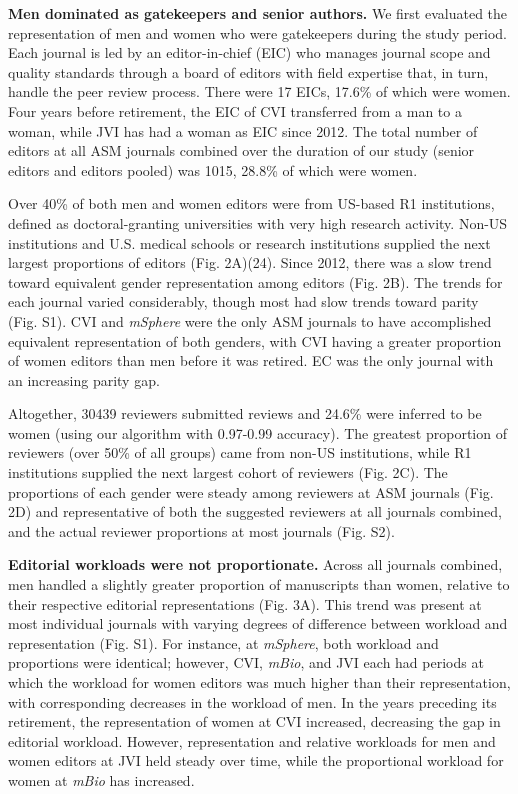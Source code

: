 \documentclass[11pt,]{article}
\begin{document}
\textbf{Men dominated as gatekeepers and senior authors.} We first
evaluated the representation of men and women who were gatekeepers
during the study period. Each journal is led by an editor-in-chief (EIC)
who manages journal scope and quality standards through a board of
editors with field expertise that, in turn, handle the peer review
process. There were 17 EICs, 17.6\% of which were women. Four years
before retirement, the EIC of CVI transferred from a man to a woman,
while JVI has had a woman as EIC since 2012. The total number of editors
at all ASM journals combined over the duration of our study (senior
editors and editors pooled) was 1015, 28.8\% of which were women.

Over 40\% of both men and women editors were from US-based R1
institutions, defined as doctoral-granting universities with very high
research activity. Non-US institutions and U.S. medical schools or
research institutions supplied the next largest proportions of editors
(Fig. 2A)(24). Since 2012, there was a slow trend toward equivalent
gender representation among editors (Fig. 2B). The trends for each
journal varied considerably, though most had slow trends toward parity
(Fig. S1). CVI and \emph{mSphere} were the only ASM journals to have
accomplished equivalent representation of both genders, with CVI having
a greater proportion of women editors than men before it was retired. EC
was the only journal with an increasing parity gap.

Altogether, 30439 reviewers submitted reviews and 24.6\% were inferred
to be women (using our algorithm with 0.97-0.99 accuracy). The greatest
proportion of reviewers (over 50\% of all groups) came from non-US
institutions, while R1 institutions supplied the next largest cohort of
reviewers (Fig. 2C). The proportions of each gender were steady among
reviewers at ASM journals (Fig. 2D) and representative of both the
suggested reviewers at all journals combined, and the actual reviewer
proportions at most journals (Fig. S2).

\textbf{Editorial workloads were not proportionate.} Across all journals
combined, men handled a slightly greater proportion of manuscripts than
women, relative to their respective editorial representations (Fig. 3A).
This trend was present at most individual journals with varying degrees
of difference between workload and representation (Fig. S1). For
instance, at \emph{mSphere}, both workload and proportions were
identical; however, CVI, \emph{mBio}, and JVI each had periods at which
the workload for women editors was much higher than their
representation, with corresponding decreases in the workload of men. In
the years preceding its retirement, the representation of women at CVI
increased, decreasing the gap in editorial workload. However,
representation and relative workloads for men and women editors at JVI
held steady over time, while the proportional workload for women at
\emph{mBio} has increased.
\end{document}
